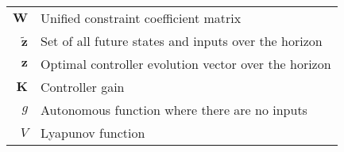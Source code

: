 \begin{scriptsize}
\begin{tabularx}{\textwidth}{r|X}
$\textbf{W}$                & Unified constraint coefficient matrix \\
$\tilde{\textbf{z}}$        & Set of all future states and inputs over the horizon\\
$\textbf{z}$                & Optimal controller evolution vector over the horizon\\
$\textbf{K}$                & Controller gain\\
$g$                         & Autonomous function where there are no inputs\\
$V$                         & Lyapunov function\\

\end{tabularx}
\end{scriptsize}


